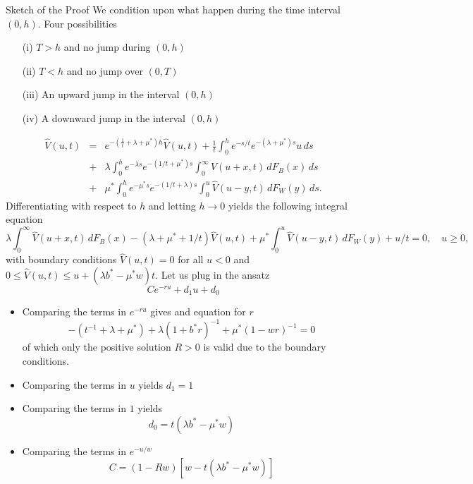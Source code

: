 \documentclass{beamer}
\def \w{\widehat}
\begin{document}
\begin{frame}[allowframebreaks]{Sketch of the Proof}
\scriptsize
We condition upon what happen during the time interval $(0,h)$. Four possibilities
\begin{itemize}
  \item[(i)] $T>h$ and no jump during $(0,h)$
  \item[(ii)] $T<h$ and no jump over $(0,T)$
  \item[(iii)] An upward jump in the interval $(0,h)$
  \item[(iv)] A downward jump in the interval $(0,h)$
\end{itemize}
  \begin{eqnarray*}\label{neu0}
      \w{V}(u,t)&=& e^{-(\frac{1}{t}+\lambda+\mu^\ast)h}\w{V}(u,t) + \frac{1}{t}\int_0^h e^{-{s}/{t}}e^{-(\lambda +\mu^\ast) s} u\,ds\\
      & +& \lambda\int_0^he^{-\lambda s} e^{-({1}/{t}+\mu^\ast) s} \int_0^\infty\w{V}(u+x,t)\,dF_{B}(x)\,ds\\
      &  +&\mu^\ast \int_0^he^{-\mu^\ast s} e^{-({1}/{t}+\lambda) s}\int_0^u \w{V}(u-y,t) \,dF_W(y)\,ds.
  \end{eqnarray*}
  Differentiating with respect to $h$ and letting $h\rightarrow 0$ yields the following integral equation
  \begin{equation} \label{inteq}
    \lambda\int_0^\infty\w{V}(u+x,t)\,dF_{B}(x)-(\lambda+\mu^\ast+{1}/{t})\w{V}(u,t)+\mu^\ast\int_0^u \w{V}(u-y,t) \,dF_W(y)+{u}/{t}=0,\quad u\ge 0,
  \end{equation}
  with boundary conditions $\w{V}(u,t)=0$ for all $u<0$ and $0\leq\w{V}(u,t)\leq u+(\lambda b^\ast - \mu^\ast w)t$. Let us plug in the ansatz
  $$
  Ce^{-ru}+d_1u+d_0
  $$
  \begin{itemize}
    \item Comparing the terms in $e^{-r u}$ gives and equation for $r$
    $$
    -(t^{-1}+\lambda+\mu^\ast)+\lambda(1+b^\ast r)^{-1}+\mu^\ast(1-wr)^{-1}=0
    $$
    of which only the positive solution $R>0$ is valid due to the boundary conditions.
    \item Comparing the terms in $u$ yields $d_1 = 1$
    \item Comparing the terms in $1$ yields
    $$
    d_0 = t(\lambda b^\ast-\mu^\ast w)
    $$
    \item Comparing the terms in $e^{-u/w}$
    $$
    C = (1 - Rw)[w-t(\lambda b^\ast-\mu^\ast w)]
    $$
  \end{itemize}
\end{frame}
\end{document}
